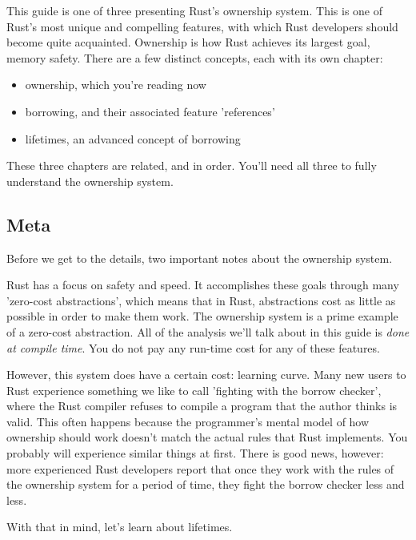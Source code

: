 This guide is one of three presenting Rust's ownership system. This is one of Rust's most unique and compelling features, with 
which Rust developers should become quite acquainted. Ownership is how Rust achieves its largest goal, memory safety. There are 
a few distinct concepts, each with its own chapter:

\begin{itemize}
  \item{ownership, which you're reading now}
  \item{borrowing, and their associated feature 'references'}
  \item{lifetimes, an advanced concept of borrowing}
\end{itemize}

These three chapters are related, and in order. You'll need all three to fully understand the ownership system.

\subsection*{Meta}

Before we get to the details, two important notes about the ownership system.

\blank

Rust has a focus on safety and speed. It accomplishes these goals through many 'zero-cost abstractions', which means that in 
Rust, abstractions cost as little as possible in order to make them work. The ownership system is a prime example of a zero-cost
abstraction. All of the analysis we'll talk about in this guide is \emph{done at compile time}. You do not pay any run-time cost 
for any of these features.

\blank

However, this system does have a certain cost: learning curve. Many new users to Rust experience something we like to call 
'fighting with the borrow checker', where the Rust compiler refuses to compile a program that the author thinks is valid. 
This often happens because the programmer's mental model of how ownership should work doesn't match the actual rules that Rust 
implements. You probably will experience similar things at first. There is good news, however: more experienced Rust developers 
report that once they work with the rules of the ownership system for a period of time, they fight the borrow checker less and less.

\blank

With that in mind, let's learn about lifetimes.

